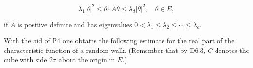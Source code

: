 $$\lambda_{1}|\theta|^{2} \leq \theta \cdot A\theta \leq \lambda_{d}|\theta|^{2}, \quad \theta \in E,$$

if $A$ is positive definite and has eigenvalues $0 < \lambda_{1} \leq \lambda_{2} \leq \cdots \leq \lambda_{d}$.

With the aid of P4 one obtains the following estimate for the real part of the characteristic function of a random walk. (Remember that by D6.3, $C$ denotes the cube with side $2\pi$ about the origin in $E$.)